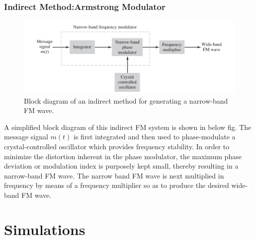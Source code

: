 \documentclass[12pt,a4paper]{article}%
\begin{document}
\begin{flushleft}
	\subsubsection{Indirect Method:Armstrong Modulator}
	\begin{center}
		\begin{figure}[!ht]
			\centering
			\includegraphics[scale=0.4]{./images/BD2.png}
			\caption{Block diagram of an indirect method for generating a narrow-band FM wave.}
			\label{BD2}
		\end{figure}
	\end{center}
	
	
	A simplified block diagram of this indirect FM system is shown in below fig. The message signal $m(t)$ is first integrated and then used to phase-modulate a crystal-controlled oscillator which provides frequency stability. In order to minimize the distortion inherent in the phase modulator, the maximum phase deviation or modulation index is purposely kept small, thereby resulting in a narrow-band FM wave. The narrow band FM wave is next multiplied in frequency by means of a frequency multiplier so as to produce the desired wide-band FM wave.
	\end{flushleft}
	\pagebreak
	\section{Simulations}
\end{document}
